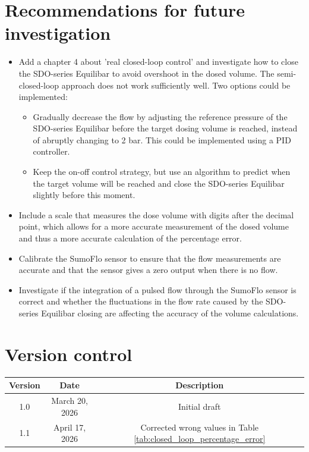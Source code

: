 \documentclass[12pt,a4paper]{article}
\begin{document}
\clearpage
\section{Recommendations for future investigation}
\begin{itemize}
    \item Add a chapter 4 about 'real closed-loop control' and investigate how to close the SDO-series Equilibar to avoid overshoot in the dosed volume. The semi-closed-loop approach does not work sufficiently well. Two options could be implemented:
    \begin{itemize}
        \item Gradually decrease the flow by adjusting the reference pressure of the SDO-series Equilibar before the target dosing volume is reached, instead of abruptly changing to 2 bar. This could be implemented using a PID controller.
        \item Keep the on-off control strategy, but use an algorithm to predict when the target volume will be reached and close the SDO-series Equilibar slightly before this moment.
    \end{itemize}
    \item Include a scale that measures the dose volume with digits after the decimal point, which allows for a more accurate measurement of the dosed volume and thus a more accurate calculation of the percentage error.
    \item Calibrate the SumoFlo sensor to ensure that the flow measurements are accurate and that the sensor gives a zero output when there is no flow.
    \item Investigate if the integration of a pulsed flow through the SumoFlo sensor is correct and whether the fluctuations in the flow rate caused by the SDO-series Equilibar closing are affecting the accuracy of the volume calculations.
\end{itemize}

\newpage
\section*{Version control}

\begin{tabular}{|c|c|c|}
\hline
Version & Date & Description \\
\hline
1.0 & March 20, 2026 & Initial draft \\
\hline
1.1 & April 17, 2026 & Corrected wrong values in Table \ref{tab:closed_loop_percentage_error} \\
\hline 
\end{tabular}
\end{document}
